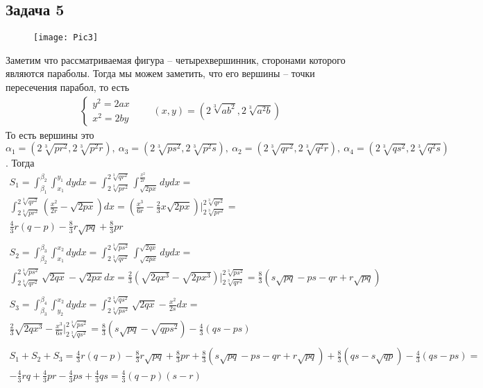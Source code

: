 \subsection*{Задача 5}
	\begin{figure}[!h]
		\texttt{[image: Pic3]}
	\end{figure}
	\vskip 0.2in
	Заметим что рассматриваемая фигура -- четырехвершинник, сторонами которого являются параболы. Тогда мы можем заметить, что его вершины -- точки пересечения парабол, то есть
	\begin{gather*}
		\begin{cases}
			y^2 = 2ax\\
			x^2 = 2by
		\end{cases}\qquad
		(x,y) = \left(2\sqrt[3]{a b^2}, 2\sqrt[3]{a^2 b}\right)
	\end{gather*}
	То есть вершины это $\alpha_{1} = \left(2\sqrt[3]{p r^2}, 2\sqrt[3]{p^2 r}\right),\ \alpha_{3} = \left(2\sqrt[3]{p s^2}, 2\sqrt[3]{p^2 s}\right),\ \alpha_{2} = \left(2\sqrt[3]{q r^2}, 2\sqrt[3]{q^2 r}\right),\ \alpha_{4} = \left(2\sqrt[3]{q s^2}, 2\sqrt[3]{q^2 s}\right)$. Тогда
	\begin{gather*}
		S_1 =
		\int_{\beta_1}^{\beta_2} \int_{x_1}^{y_1} dy dx = 
		\int_{2\sqrt[3]{pr^2}}^{2\sqrt[3]{qr^2}} \int_{\sqrt{2px}}^{\frac{x^2}{2r}} dy dx =\\
		\int_{2\sqrt[3]{pr^2}}^{2\sqrt[3]{qr^2}} \left(\frac{x^2}{2r} - \sqrt{2px}\right)dx =
		\left(\frac{x^3}{6r} - \frac{2}{3}x \sqrt{2px} \right) \bigg|_{2\sqrt[3]{pr^2}}^{2\sqrt[3]{qr^2}} =\\
		\frac{4}{3} r(q-p) - \frac{8}{3}r \sqrt{pq} + \frac{8}{3} pr\\
		\\
		S_2 = 
		\int_{\beta_2}^{\beta_3} \int_{x_1}^{x_2} dy dx =
		\int_{2\sqrt[3]{qr^2}}^{2\sqrt[3]{ps^2}} \int_{\sqrt{2px}}^{\sqrt{2qx}} dy dx =\\
		\int_{2\sqrt[3]{qr^2}}^{2\sqrt[3]{ps^2}} \sqrt{2qx} - \sqrt{2px} dx =
		\frac{2}{3}(\sqrt{2qx^3} - \sqrt{2px^3})\bigg|_{2\sqrt[3]{qr^2}}^{2\sqrt[3]{ps^2}} =
		\frac{8}{3}(s\sqrt{pq} - ps - qr + r\sqrt{pq})\\
		\\
		S_3 =
		\int_{\beta_3}^{\beta_4} \int_{y_2}^{x_2} dy dx =
		\int_{2\sqrt[3]{ps^2}}^{2\sqrt[3]{qs^2}} \sqrt{2qx} - \frac{x^2}{2s} dx =\\
		\frac{2}{3} \sqrt{2qx^3} - \frac{x^3}{6s} \bigg|_{2\sqrt[3]{qs^2}}^{2\sqrt[3]{ps^2}} =
		\frac{8}{3}(s\sqrt{pq} - \sqrt{qps^2}) - \frac{4}{3}(qs - ps)\\
		\\
		S_1 + S_2 + S_3 =
		\frac{4}{3}r(q-p) - \frac{8}{3}r\sqrt{pq} + \frac{8}{3}pr + \frac{8}{3}(s\sqrt{pq} - ps - qr + r\sqrt{pq}) + \frac{8}{3}(qs - s\sqrt{qp}) - \frac{4}{3}(qs - ps) = \\
		-\frac{4}{3}rq + \frac{4}{3}pr - \frac{4}{3}ps + \frac{4}{3}qs = 
		\frac{4}{3}(q-p)(s-r)
	\end{gather*}
\vskip 0.4in


